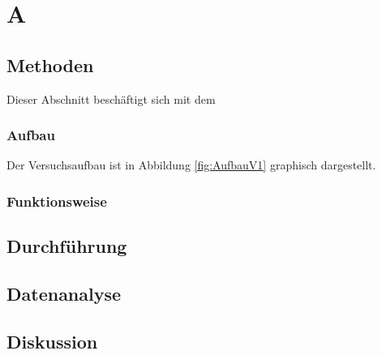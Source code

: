\section{A}
	
	\subsection{Methoden}
		
		Dieser Abschnitt beschäftigt sich mit dem %
	
		\subsubsection{Aufbau}
		
			Der Versuchsaufbau ist in Abbildung \ref{fig:AufbauV1} graphisch dargestellt.
			
			
		\subsubsection{Funktionsweise}
			
			
	\subsection{Durchführung}
		
		
	\subsection{Datenanalyse}
	
		
	\subsection{Diskussion}
	
